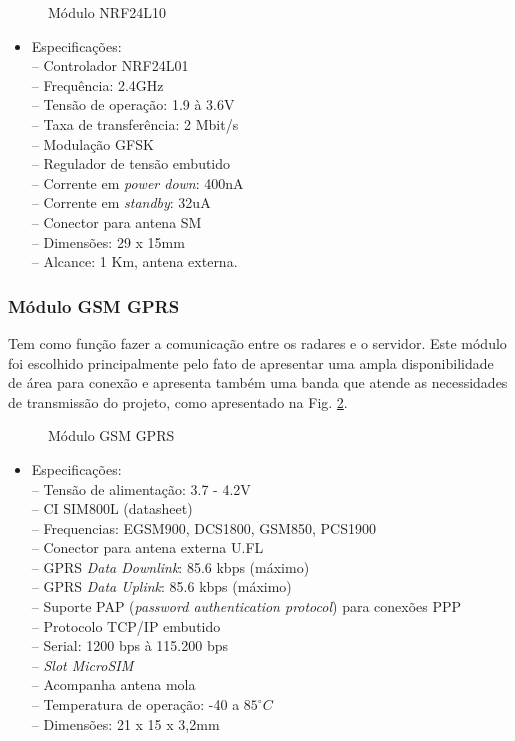 \begin{figure}[!htb]
	\caption{\label{fig:nrf24} Módulo NRF24L10}
\end{figure}
\begin{itemize}
    
\item  Especificações:\\
– Controlador NRF24L01\\
– Frequência: 2.4GHz\\
– Tensão de operação: 1.9 à 3.6V\\
– Taxa de transferência: 2 Mbit/s\\
– Modulação GFSK\\
– Regulador de tensão embutido\\
– Corrente em \emph{power down}: 400nA\\
– Corrente em \emph{standby}: 32uA\\
– Conector para antena SM\\
– Dimensões: 29 x 15mm\\
– Alcance: 1 Km, antena externa.
\end{itemize}

 \subsubsection{Módulo GSM GPRS}
 
Tem como função fazer a comunicação entre os radares e o servidor. Este módulo foi escolhido principalmente pelo fato de apresentar uma ampla disponibilidade de área para conexão e apresenta também uma banda que atende as necessidades de transmissão do projeto, como apresentado na Fig. \ref{fig:gsm}.

 
\begin{figure}[!htb]
	\caption{\label{fig:gsm} Módulo GSM  GPRS}
\end{figure}

 \begin{itemize}
    
\item Especificações:\\
–  Tensão de alimentação: 3.7 - 4.2V\\
– CI SIM800L (datasheet)\\
– Frequencias: EGSM900, DCS1800, GSM850, PCS1900\\
– Conector para antena externa U.FL\\
– GPRS\emph{ Data Downlink}: 85.6 kbps (máximo)\\
– GPRS \emph{Data Uplink}: 85.6 kbps (máximo)\\
– Suporte PAP (\emph{password authentication protocol}) para conexões PPP\\
– Protocolo TCP/IP embutido\\
– Serial: 1200 bps à 115.200 bps\\
– \emph{Slot MicroSIM}\\
– Acompanha antena mola\\
– Temperatura de operação: -40 a $85^{\circ}C$\\
– Dimensões: 21 x 15 x 3,2mm
\end{itemize}

